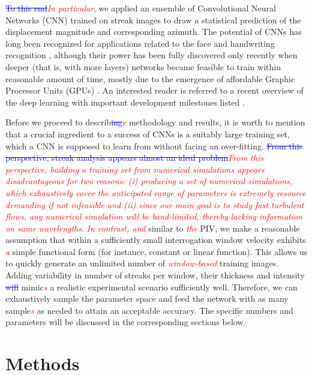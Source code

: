 \documentclass{svjour3}                     %
\newcommand{\new}[1]{\textit{\textcolor{red}{#1}}}
\newcommand{\old}[1]{\textcolor{blue}{\sout{#1}}}
\begin{document}
\old{To this end}\new{In particular}, we applied an ensemble of Convolutional Neural Networks (CNN) trained on streak images to draw a statistical prediction of the displacement magnitude and corresponding azimuth. The potential of CNNs has long been recognized for applications related to the face and handwriting recognition \cite{lawrence1997face, simard2003best}, although their power has been fully discovered only recently when deeper (that is, with more layers) networks became feasible to train within reasonable amount of time, mostly due to the emergence of affordable Graphic Processor Units (GPUs) \cite{krizhevsky2012imagenet, karpathy2014large}. An interested reader is referred to a recent overview of the deep learning with important development milestones listed \cite{lecun2015deep}.

Before we proceed to describ\old{ing}\new{e} methodology and results, it is worth to mention that a crucial ingredient to a success of CNNs is a suitably large training set, which a CNN is supposed to learn from without facing an over-fitting. \old{From this perspective, streak analysis appears almost an ideal problem}\new{From this perspective, building a training set from numerical simulations appears disadvantageous for two reasons: (i) producing a set of numerical simulations, which exhaustively cover the anticipated range of parameters is extremely resource demanding if not infeasible and (ii) since our main goal is to study fast turbulent flows, any numerical simulation will be band-limited, thereby lacking information on some wavelengths}. \new{In contrast, and} similar to \new{the} PIV, we make a reasonable assumption that within a sufficiently small interrogation window velocity exhibits \new{a} simple functional form (for instance, constant or linear function). This allows us to quickly generate an unlimited number of \new{window-based} training images. Adding variability in number of streaks per window, their thickness and intensity \old{will} mimic\new{s} a realistic experimental scenario sufficiently well. Therefore, we can exhaustively sample the parameter space and feed the network with as many sample\new{s} as needed to attain an acceptable accuracy. The specific numbers and parameters will be discussed in the corresponding sections below.

\section{Methods}
\label{sec:methodology}
\end{document}

